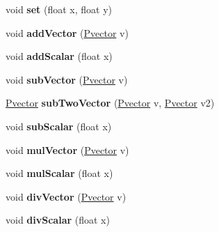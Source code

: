 \begin{DoxyCompactItemize}
\item 
void {\bfseries set} (float x, float y)\hypertarget{class_pvector_a77eb246570e459227cb4c317af0012b7}{}\label{class_pvector_a77eb246570e459227cb4c317af0012b7}

\item 
void {\bfseries add\+Vector} (\hyperlink{class_pvector}{Pvector} v)\hypertarget{class_pvector_aacdb0c22529bdfa27907013843f78963}{}\label{class_pvector_aacdb0c22529bdfa27907013843f78963}

\item 
void {\bfseries add\+Scalar} (float x)\hypertarget{class_pvector_ab130e1e66e4a33ecf370203e43de191c}{}\label{class_pvector_ab130e1e66e4a33ecf370203e43de191c}

\item 
void {\bfseries sub\+Vector} (\hyperlink{class_pvector}{Pvector} v)\hypertarget{class_pvector_a11ea8cbdc8cc308d5509d5bb85142001}{}\label{class_pvector_a11ea8cbdc8cc308d5509d5bb85142001}

\item 
\hyperlink{class_pvector}{Pvector} {\bfseries sub\+Two\+Vector} (\hyperlink{class_pvector}{Pvector} v, \hyperlink{class_pvector}{Pvector} v2)\hypertarget{class_pvector_a255e0fda569608930ed7986763f6ab85}{}\label{class_pvector_a255e0fda569608930ed7986763f6ab85}

\item 
void {\bfseries sub\+Scalar} (float x)\hypertarget{class_pvector_a0b07f3f6bbdf88179a0aac0bc58b73e1}{}\label{class_pvector_a0b07f3f6bbdf88179a0aac0bc58b73e1}

\item 
void {\bfseries mul\+Vector} (\hyperlink{class_pvector}{Pvector} v)\hypertarget{class_pvector_a70d8afa3b3b30c4c0877bdac66ad5e4a}{}\label{class_pvector_a70d8afa3b3b30c4c0877bdac66ad5e4a}

\item 
void {\bfseries mul\+Scalar} (float x)\hypertarget{class_pvector_aca5515b7c409f641c5565ca0f5bb2940}{}\label{class_pvector_aca5515b7c409f641c5565ca0f5bb2940}

\item 
void {\bfseries div\+Vector} (\hyperlink{class_pvector}{Pvector} v)\hypertarget{class_pvector_aa855eaf087ce971b0aac806aa486793d}{}\label{class_pvector_aa855eaf087ce971b0aac806aa486793d}

\item 
void {\bfseries div\+Scalar} (float x)\hypertarget{class_pvector_a3d60b718b1d2434e52e45a83ea568baf}{}\label{class_pvector_a3d60b718b1d2434e52e45a83ea568baf}


\end{DoxyCompactItemize}
